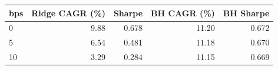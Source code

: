 \begin{tabular}{lrrrr}
\toprule
bps & Ridge CAGR (\%) & Sharpe & BH CAGR (\%) & BH Sharpe \\
\midrule
0 & 9.88 & 0.678 & 11.20 & 0.672 \\
5 & 6.54 & 0.481 & 11.18 & 0.670 \\
10 & 3.29 & 0.284 & 11.15 & 0.669 \\
\bottomrule
\end{tabular}
